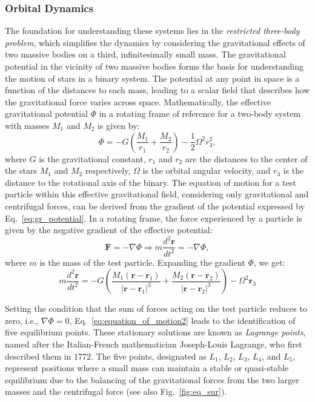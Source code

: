\documentclass[main.tex]{subfiles}
\begin{document}
    \subsubsection{Orbital Dynamics}
    The foundation for understanding these systems lies in the \textit{restricted three-body problem}, which simplifies the dynamics by considering the gravitational effects of two massive bodies on a third, infinitesimally small mass. The gravitational potential in the vicinity of two massive bodies forms the basis for understanding the motion of stars in a binary system. The potential at any point in space is a function of the distances to each mass, leading to a scalar field that describes how the gravitational force varies across space. Mathematically, the effective gravitational potential $\Phi$ in a rotating frame of reference for a two-body system with masses $M_1$ and $M_2$ is given by:
    \begin{equation}\label{eq:gr_potential}
        \Phi = -G \left(\frac{M_1}{r_1} + \frac{M_2}{r_2} \right) - \frac{1}{2}\Omega^2 r_3^2,
    \end{equation}
    where $G$ is the gravitational constant, $r_1$ and $r_2$ are the distances to the center of the stars $M_1$ and $M_2$ respectively, $\Omega$ is the orbital angular velocity, and $r_3$ is the distance to the rotational axis of the binary. The equation of motion for a test particle within this effective gravitational field, considering only gravitational and centrifugal forces, can be derived from the gradient of the potential expressed by Eq.~\eqref{eq:gr_potential}.  In a rotating frame, the force experienced by a particle is given by the negative gradient of the effective potential:
    \begin{equation}\label{eq:equation_of_motion1}
        \pmb{F} = -\nabla \Phi \Rightarrow m\frac{d^2 \pmb{r}}{dt^2} = -\nabla \Phi,
    \end{equation}
    where $m$ is the mass of the test particle. Expanding the gradient $\Phi$, we get:
    \begin{equation}\label{eq:equation_of_motion2}
        m \frac{d^2 \pmb{r}}{dt^2} = -G \left( \frac{M_1 (\pmb{r} - \pmb{r}_1)}{|\pmb{r} - \pmb{r}_1|^3} + \frac{M_2 (\pmb{r} - \pmb{r}_2)}{|\pmb{r} - \pmb{r}_2|^3} \right) - \Omega^2 \pmb{r}_3
    \end{equation}
    
    Setting the condition that the sum of forces acting on the test particle reduces to zero, i.e., $\nabla \Phi = 0$, Eq.~\eqref{eq:equation_of_motion2} leads to the identification of five equilibrium points. These stationary solutions are known as \textit{Lagrange points}, named after the Italian-French mathematician Joseph-Louis Lagrange, who first described them in 1772. The five points, designated as $L_1$, $L_2$, $L_3$, $L_4$, and $L_5$, represent positions where a small mass can maintain a stable or quasi-stable equilibrium due to the balancing of the gravitational forces from the two larger masses and the centrifugal force (see also Fig.~\ref{fig:eq_sur}). 
\end{document}
